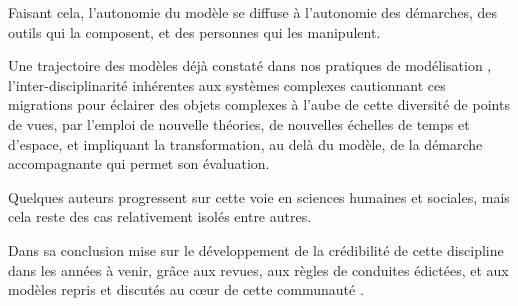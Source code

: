 Faisant cela, l'autonomie du modèle se diffuse à l'autonomie des démarches, des outils qui la composent, et des personnes qui les manipulent. 

Une trajectoire des modèles déjà constaté dans nos pratiques de modélisation \autocite{Banos2013}, l'inter-disciplinarité inhérentes aux systèmes complexes cautionnant ces migrations pour éclairer des objets complexes à l'aube de cette diversité de points de vues, par l'emploi de nouvelle théories, de nouvelles échelles de temps et d'espace, et impliquant la transformation, au delà du modèle, de la démarche accompagnante qui permet son évaluation. 

Quelques auteurs progressent sur cette voie en sciences humaines et sociales, mais cela reste des cas relativement isolés \autocite{Ngo2012} \autocite{Schmitt2014} \autocite{Heppenstall2007} \autocite{Stonedahl2011a} entre autres.

Dans sa conclusion \autocite{Rouchier2013} mise sur le développement de la crédibilité de cette discipline dans les années à venir, grâce aux revues, aux règles de conduites édictées, et aux modèles repris et discutés au cœur de cette communauté \autocite{Hales2003}. 





